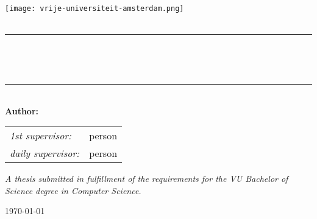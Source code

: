 \begin{titlepage}
    \newcommand{\HRule}{\rule{0.8\linewidth}{0.2mm}}

    \centering

    \vspace*{6em}

    \textsc{\large \theinstitution}\\[1em]

    \texttt{[image: vrije-universiteit-amsterdam.png]}\\
    \vspace{4em}
    \textsc{\Large \thesubject}\\
    \vspace{4em}

    \HRule\\[0.7cm]

    \begin{minipage}{0.75\textwidth}
      \centering
      {\LARGE\bfseries \thetitle}\\[0.4cm]
      \vspace{1em}
    \end{minipage}

    \HRule\\[1.5cm]

    {\Large \textbf{Author:} \theauthor}\\
    \vspace{2em}
    \begin{minipage}{0.7\textwidth}
      \large
      \centering
      \begin{tabular}{ l l }
        \textit{1st supervisor:}      & person\\
        \textit{daily supervisor:}    & person\\
      \end{tabular}
    \end{minipage}

    \vfill
    \begin{minipage}{0.8\textwidth}
      \centering
      \textit{\large
        A thesis submitted in fulfillment of the requirements for the VU Bachelor of Science degree in Computer Science.
      }
    \end{minipage}

    \vspace{2em}
    {\large\today}

    \vspace{4em}
\end{titlepage}
